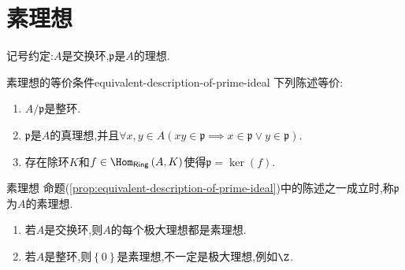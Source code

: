 \section{素理想}

记号约定:$A$是交换环,$\mathfrak{p}$是$A$的理想.

\begin{proposition}{素理想的等价条件}{equivalent-description-of-prime-ideal}
	下列陈述等价:
	\begin{enumerate}
		\item $A/\mathfrak{p}$是整环.
		\item $\mathfrak{p}$是$A$的真理想,并且$\forall x,y\in A\left(xy\in\mathfrak{p}\implies x\in\mathfrak{p}\vee y\in\mathfrak{p}\right)$.
		\item 存在除环$K$和$f\in\Hom_{\mathsf{Ring}}\left(A,K\right)$使得$\mathfrak{p}=\ker\left(f\right)$.
	\end{enumerate}
\end{proposition}

\begin{definition}{素理想}{}
	命题(\ref{prop:equivalent-description-of-prime-ideal})中的陈述之一成立时,称$\mathfrak{p}$为$A$的素理想.
\end{definition}

\begin{example}{}{}
	\begin{enumerate}
		\item 若$A$是交换环,则$A$的每个极大理想都是素理想.
		\item 若$A$是整环,则$\left\{0\right\}$是素理想,不一定是极大理想,例如$\Z$.
	\end{enumerate}
\end{example}




